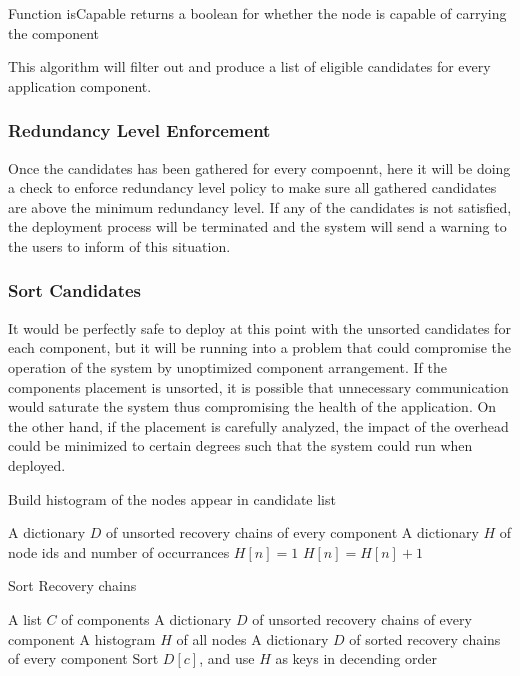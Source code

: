 Function isCapable returns a boolean for whether the node is capable of
carrying the component

This algorithm will filter out and produce a list of eligible candidates for
every application component.

\subsubsection{Redundancy Level Enforcement}

Once the candidates has been gathered for every compoennt, here it will be
doing a check to enforce redundancy level policy to make sure all gathered
candidates are above the minimum redundancy level. If any of the candidates is
not satisfied, the deployment process will be terminated and the system will
send a warning to the users to inform of this situation.

\subsubsection{Sort Candidates}

It would be perfectly safe to deploy at this point with the unsorted candidates
for each component, but it will be running into a problem that could compromise
the operation of the system by unoptimized component arrangement. If the
components placement is unsorted, it is possible that unnecessary communication
would saturate the system thus compromising the health of the application. On
the other hand, if the placement is carefully analyzed, the impact of the
overhead could be minimized to certain degrees such that the system could run
when deployed.

\begin{algorithm}
\caption{Build histogram of the nodes appear in candidate list}
\label{alg:build-histogram}
\begin{algorithmic}
\Require A dictionary $D$ of unsorted recovery chains of every component
\Ensure A dictionary $H$ of node ids and number of occurrances
      \State $H[n] = 1$
    \Else
      \State $H[n] = H[n] + 1$
    \EndIf
  \EndFor
\EndFor
\end{algorithmic}
\end{algorithm}

\begin{algorithm}
\caption{Sort Recovery chains}
\label{alg:sort-recovery-chain}
\begin{algorithmic}
\Require A list $C$ of components
\Require A dictionary $D$ of unsorted recovery chains of every component
\Require A histogram $H$ of all nodes
\Ensure A dictionary $D$ of sorted recovery chains of every component
  \State Sort $D[c]$, and use $H$ as keys in decending order
\EndFor
\end{algorithmic}
\end{algorithm}

